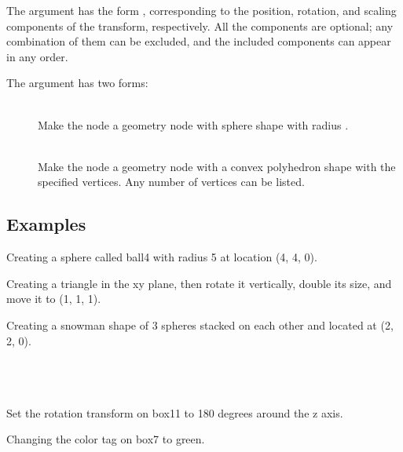 The  argument has the form \soar{[p X Y Z] [r X Y Z] [s X Y Z]}, corresponding to the position, rotation, and scaling components of the transform, respectively.
All the components are optional; any combination of them can be excluded, and the included components can appear in any order.

The  argument has two forms:

\begin{description}
	\item[] \hfill \\
		Make the node a geometry node with sphere shape with radius .
	\item[] \hfill \\
		Make the node a geometry node with a convex polyhedron shape with the specified vertices.
		Any number of vertices can be listed.
\end{description}


\subsection{Examples}

Creating a sphere called ball4 with radius 5 at location (4, 4, 0). \\

Creating a triangle in the xy plane, then rotate it vertically, double its size, and move it to (1, 1, 1).  \\

Creating a snowman shape of 3 spheres stacked on each other and located at (2, 2, 0). \\
 \\
 \\
 \\

Set the rotation transform on box11 to 180 degrees around the z axis. \\

Changing the color tag on box7 to green. \\


